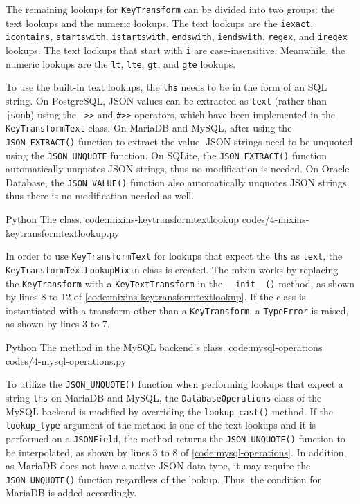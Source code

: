 The remaining lookups for \verb|KeyTransform| can be divided into two groups:
the text lookups and the numeric lookups. The text lookups are the
\verb|iexact|, \verb|icontains|, \verb|startswith|, \verb|istartswith|,
\verb|endswith|, \verb|iendswith|, \verb|regex|, and \verb|iregex| lookups. The
text lookups that start with \verb|i| are case-insensitive. Meanwhile, the
numeric lookups are the \verb|lt|, \verb|lte|, \verb|gt|, and \verb|gte|
lookups.

To use the built-in text lookups, the \verb|lhs| needs to be in the form of an
SQL string. On PostgreSQL, JSON values can be extracted as \verb|text| (rather
than \verb|jsonb|) using the \verb|->>| and \verb|#>>| operators, which have
been implemented in the \verb|KeyTransformText| class. On MariaDB and MySQL,
after using the \verb|JSON_EXTRACT()| function to extract the value, JSON
strings need to be unquoted using the \verb|JSON_UNQUOTE| function. On SQLite,
the \verb|JSON_EXTRACT()| function automatically unquotes JSON strings, thus no
modification is needed. On Oracle Database, the \verb|JSON_VALUE()| function
also automatically unquotes JSON strings, thus there is no modification needed
as well.

\listing
{Python}
{The  class.}
{code:mixins-keytransformtextlookup}
{codes/4-mixins-keytransformtextlookup.py}

In order to use \verb|KeyTransformText| for lookups that expect the \verb|lhs|
as \verb|text|, the \verb|KeyTransformTextLookupMixin| class is created. The
mixin works by replacing the \verb|KeyTransform| with a \verb|KeyTextTransform|
in the \verb|__init__()| method, as shown by lines 8 to 12 of
\autoref{code:mixins-keytransformtextlookup}. If the class is instantiated with
a transform other than a \verb|KeyTransform|, a \verb|TypeError| is raised, as
shown by lines 3 to 7.

\listing
{Python}
{The  method in the MySQL backend's
 class.}
{code:mysql-operations}
{codes/4-mysql-operations.py}

To utilize the \verb|JSON_UNQUOTE()| function when performing lookups that
expect a string \verb|lhs| on MariaDB and MySQL, the \verb|DatabaseOperations|
class of the MySQL backend is modified by overriding the \verb|lookup_cast()|
method. If the \verb|lookup_type| argument of the method is one of the text
lookups and it is performed on a \verb|JSONField|, the method returns the
\verb|JSON_UNQUOTE()| function to be interpolated, as shown by lines 3 to 8 of
\autoref{code:mysql-operations}. In addition, as MariaDB does not have a native
JSON data type, it may require the \verb|JSON_UNQUOTE()| function regardless of
the lookup. Thus, the condition for MariaDB is added accordingly.

